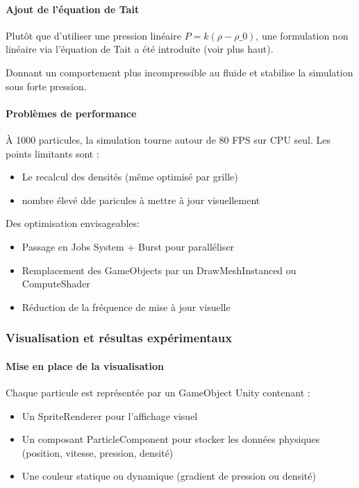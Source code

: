 \documentclass{article}
\begin{document}
\paragraph{Ajout de l'équation de Tait}

Plutôt que d’utiliser une pression linéaire \(P = k(ρ - ρ\_0)\), une formulation non linéaire via l’équation de Tait a été introduite (voir plus haut).

Donnant un comportement plus incompressible au fluide et stabilise la simulation sous forte pression.

\paragraph{Problèmes de performance}

À 1000 particules, la simulation tourne autour de 80 FPS sur CPU seul. Les points limitants sont :

\begin{itemize}
    \item Le recalcul des densités (même optimisé par grille)
    \item nombre élevé dde paricules à mettre à jour visuellement
\end{itemize}

Des optimisation envisageables:

\begin{itemize}
    \item Passage en Jobs System + Burst pour paralléliser
    \item Remplacement des GameObjects par un DrawMeshInstanced ou ComputeShader
    \item Réduction de la fréquence de mise à jour visuelle
\end{itemize}

\subsubsection{Visualisation et résultas expérimentaux}

\paragraph{Mise en place de la visualisation}

Chaque particule est représentée par un GameObject Unity contenant :

\begin{itemize}
    \item Un SpriteRenderer pour l'affichage visuel
    \item Un composant ParticleComponent pour stocker les données physiques (position, vitesse, pression, densité)
    \item Une couleur statique ou dynamique (gradient de pression ou densité)
\end{itemize}
\end{document}

